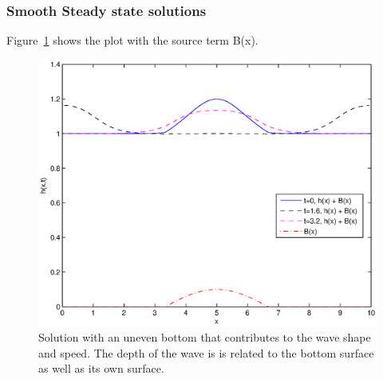 

\subsubsection{Smooth Steady state solutions} 

\label{subsub:smooth_steady_state_solutions}

Figure~\ref{fig:Figures_steadySolutionsp1_n_is_80_a_0} shows the plot with the source term B(x).
\begin{figure}
	[htbp] \centering 
	\includegraphics[width=\MyWidth]{Figures/steadySolutionsp1_n_is_80_a_0.eps} \caption{Solution with an uneven bottom that contributes to the wave shape and speed. The depth of the wave is is related to the bottom surface as well as its own surface.} \label{fig:Figures_steadySolutionsp1_n_is_80_a_0} 
\end{figure}


